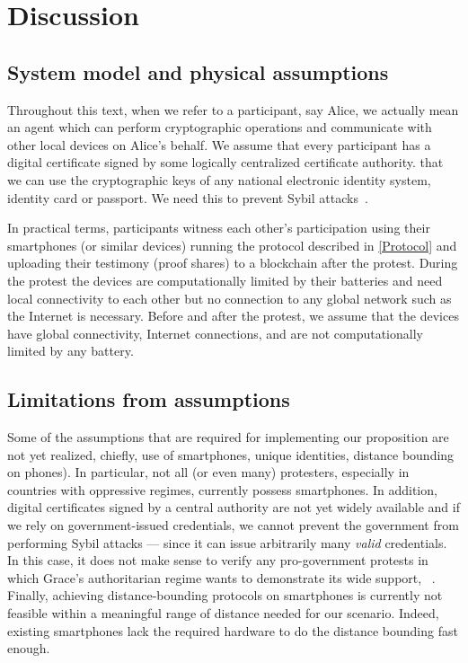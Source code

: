 \section{Discussion}%
\label{discussion}


\subsection{System model and physical assumptions}\label{assumptions}

Throughout this text, when we refer to a participant, say Alice, we actually 
mean an agent which can perform cryptographic operations and communicate with 
other local devices on Alice's behalf. We assume that every participant has a digital certificate signed by 
some logically centralized certificate authority.
\Eg that we can use the cryptographic keys of any national electronic identity 
system, identity card or passport.
We need this to prevent Sybil attacks~\cite{SybilAttack}.

In practical terms, participants witness each other's participation
using their smartphones (or similar devices) running the protocol described in
\cref{Protocol} and uploading their testimony (\ie proof shares) to a blockchain 
after the protest. During the protest the devices are computationally limited by 
their batteries and need local connectivity to each other but no connection to
any global network such as the Internet is necessary. Before and
after the protest, we assume that the devices have global connectivity, \ie 
Internet  connections, and are not computationally limited by any battery.



\subsection{Limitations from assumptions} 

Some of the assumptions that are required for implementing our
proposition are not yet realized, chiefly, use of smartphones, unique
identities, distance bounding on phones). 
In particular, not all (or even many) protesters, especially in countries with oppressive regimes, currently possess smartphones.
In addition, digital certificates signed by a central authority are not yet widely available and if we rely on government-issued credentials, we cannot prevent the government from performing Sybil attacks --- since it can issue arbitrarily many \emph{valid} credentials.
In this case, it does not make sense to verify any pro-government protests in which Grace's authoritarian regime wants to demonstrate its wide support, \eg~\cite{AlJazeeraOnVenezuela2017,VenezuelanStateWorkersCalledToParticipate}.
Finally, achieving distance-bounding protocols on smartphones is currently not feasible within a meaningful range of distance needed for our scenario.
Indeed, existing smartphones lack the required hardware to do the distance bounding fast enough.

